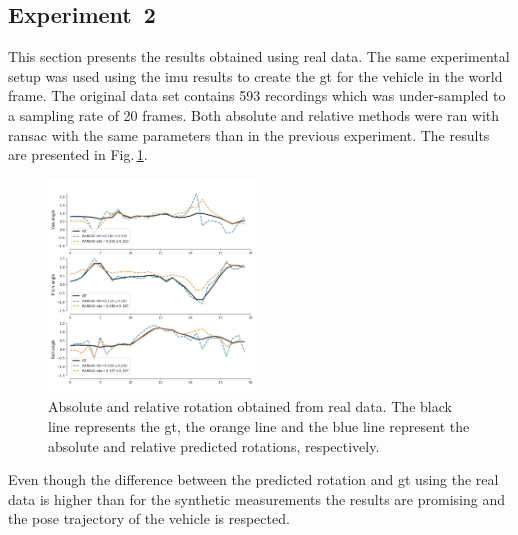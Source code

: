 \subsection{Experiment~2}
\label{sec:exp2}
This section presents the results obtained using real data. The same
experimental setup was used using the \gls{imu} results to create the \gls{gt}
for the vehicle in the world frame.  The original data set contains 593
recordings which was under-sampled to a sampling rate of 20 frames.  Both
absolute and relative methods were ran with \gls{ransac} with the same
parameters than in the previous experiment. The results are presented in
Fig.\,\ref{fig:res-real}.
\begin{figure}
  \centering
  \includegraphics[width=0.49\textwidth]{./content/experiments/figures/real-res.jpeg}
  \caption{Absolute and relative rotation obtained from real data. The black
    line represents the \gls{gt}, the orange line and the blue line represent
    the absolute and relative predicted rotations, respectively.}
  \label{fig:res-real}
\end{figure}

Even though the difference between the predicted rotation and \gls{gt} using
the real data is higher than for the synthetic measurements the results are
promising and the pose trajectory of the vehicle is respected.











